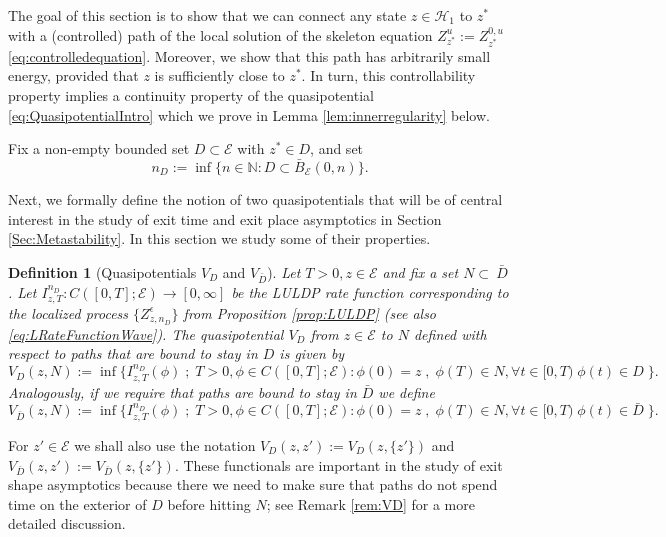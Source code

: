 \documentclass[10pt, reqno]{amsart}
\newcommand{\N}{\mathbb{N}}
\newcommand{\h}{\mathcal{H}}
\newcommand{\e}{\mathcal{E}}
\newtheorem{dfn}{Definition}
\theoremstyle{definition}
\numberwithin{lem}{section}
\numberwithin{cor}{section}
\numberwithin{prop}{section}
\numberwithin{thm}{section}
\numberwithin{dfn}{section}
\begin{document}
The goal of this section is to show that we can connect any state $z\in\h_1$ to $z^*$ with a (controlled) path of the local solution of the skeleton equation $Z_{z^*}^{u}:=Z_{z^*}^{0,u}$ \eqref{eq:controlledequation}. Moreover, we show that this path has arbitrarily small energy, provided that $z$ is sufficiently close to $z^*$. In turn, this controllability property implies a continuity property of the quasipotential \eqref{eq:QuasipotentialIntro} which we prove in Lemma \ref{lem:innerregularity} below. 

Fix a non-empty bounded set  $D\subset\e$ with $z^*\in D$, 
and set
\begin{equation}\label{eq:nDdefinition}
    n_D:=\inf\big\{ n\in\N: D\subset \bar{B}_\e(0, n)       \big\}.
\end{equation}


Next, we formally define the notion of two quasipotentials that will be of central interest in the study of exit time and exit place asymptotics in Section \ref{Sec:Metastability}. In this section we study some of their properties.


\begin{dfn}[Quasipotentials $V_D$ and $V_{\bar{D}}$]\label{dfn:quasipotentialVd} Let $T>0, z\in\e$ and fix a set $N\subset\ \bar{D}$. Let $I^{n_{D}}_{z,T}: C([0,T];\e)\rightarrow [0,\infty]$ be the LULDP rate function corresponding to the localized process $\{Z^\epsilon_{z,n_D}\}$ from Proposition \ref{prop:LULDP} (see also  \eqref{eq:LRateFunctionWave}). The quasipotential $V_D$ from $z\in\e$ to $N$ defined with respect to paths that are bound to stay in $D$ is given by 
\begin{equation}
    \label{eq:VDquasipotential}
    V_D(z, N):=\inf\bigg\{ I^{n_D}_{z,T}(\phi)\;;\;T>0, \phi\in C([0,T];\e): \phi(0)=z\;,\;\phi(T)\in N, \forall t\in[0,T)\; \phi(t)\in D\; \bigg\}.
\end{equation}
Analogously, if we require that paths are bound to stay in $\bar{D}$ we define
\begin{equation}
    \label{eq:VDbarquasipotential}
    V_{\bar{D}}(z, N):=\inf\bigg\{ I^{n_D}_{z,T}(\phi)\;;\;T>0, \phi\in C([0,T];\e): \phi(0)=z\;,\;\phi(T)\in N, \forall t\in[0,T)\; \phi(t)\in \bar{D}\; \bigg\}.
\end{equation}
\end{dfn}


For $z'\in\e$ we shall also use the notation $V_D(z, z'):=V_D(z, \{z'\})$ and $V_{\bar{D}}(z, z'):=V_{\bar{D}}(z, \{z'\})$. These functionals are important in the study of exit shape asymptotics because there we need to make sure that paths do not spend time on the exterior of $D$ before hitting $N$; see Remark \ref{rem:VD} for a more detailed discussion.
\end{document}
